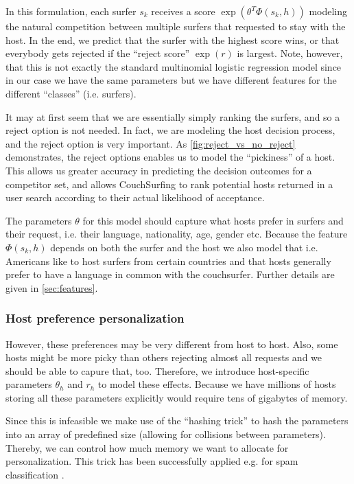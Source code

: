 In this formulation, each surfer $s_k$ receives a score $\exp(\theta^T \Phi(s_k,h))$ modeling the natural competition between multiple surfers that requested to stay with the host.
In the end, we predict that the surfer with the highest score wins, or that everybody gets rejected if the ``reject score'' $\exp{(r)}$ is largest. 
Note, however, that this is not exactly the standard multinomial logistic regression model since in our case we have the same parameters but we have different features for the different ``classes'' (i.e. surfers). 

It may at first seem that we are essentially simply ranking the surfers, and so a reject option is not needed.
In fact, we are modeling the host decision process, and the reject option is very important.
As \autoref{fig:reject_vs_no_reject} demonstrates, the reject options enables us to model the ``pickiness'' of a host.
This allows us greater accuracy in predicting the decision outcomes for a competitor set, and allows CouchSurfing to rank potential hosts returned in a user search according to their actual likelihood of acceptance.

The parameters $\theta$ for this model should capture what hosts prefer in surfers and their request, i.e. their language, nationality, age, gender etc.
Because the feature $\Phi(s_k,h)$ depends on both the surfer and the host we also model that i.e. Americans like to host surfers from certain countries and that hosts generally prefer to have a language in common with the couchsurfer.
Further details are given in \autoref{sec:features}.

\subsubsection{Host preference personalization}
However, these preferences may be very different from host to host.
Also, some hosts might be more picky than others rejecting almost all requests and we should be able to capure that, too.
Therefore, we introduce host-specific parameters $\theta_h$ and $r_h$ to model these effects.
Because we have millions of hosts storing all these parameters explicitly would require tens of gigabytes of memory.

Since this is infeasible we make use of the ``hashing trick'' to hash the parameters into an array of predefined size (allowing for collisions between parameters).
Thereby, we can control how much memory we want to allocate for personalization.
This trick has been successfully applied e.g. for spam classification \cite{Attenberg2009}.

